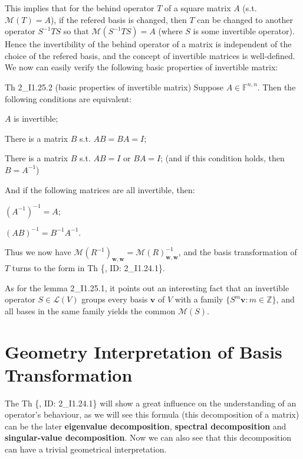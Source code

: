 \documentclass{article}
\begin{document}
This implies that for the behind operator $T$ of a square matrix $A$ (s.t. $\mathcal{M}(T) = A$), if the refered basis is changed, then $T$ can be changed to another operator $S^{-1}TS$ so that $\mathcal{M}(S^{-1}TS) = A$ (where $S$ is some invertible operator). Hence the invertibility of the behind operator of a matrix is independent of the choice of the refered basis, and the concept of invertible matrices is well-defined. We now can easily verify the following basic properties of invertible matrix:

\begin{Th}{Th 2\_I1.25.2 (basic properties of invertible matrix)}
    Suppose $A\in\mathbb{F}^{n,n}$. Then the following conditions are equivalent:
    \begin{compactenum}
        \item $A$ is invertible;        
        \item There is a matrix $B$ s.t. $AB=BA=I$; 
        \item There is a matrix $B$ s.t. $AB=I$ or $BA=I$; (and if this condition holds, then $B = A^{-1}$)
    \end{compactenum}
    And if the following matrices are all invertible, then:
    \begin{compactenum}
        \item $(A^{-1})^{-1} = A$;
        \item $(AB)^{-1} = B^{-1}A^{-1}$.
    \end{compactenum}
\end{Th}

Thus we now have $\mathcal{M}(R^{-1})_{\pmb{w}, \pmb{w}} = \mathcal{M}(R)^{-1}_{\pmb{w}, \pmb{w}}$, and the basis transformation of $T$ turns to the form in Th \{, ID: 2\_I1.24.1\}.

As for the lemma 2\_I1.25.1, it points out an interesting fact that an invertible operator $S\in\mathcal{L}(V)$ groups every basis $\pmb{v}$ of $V$ with a family $\{S^{m}\pmb{v}: m\in\mathbb{Z}\}$, and all bases in the same family yields the common $\mathcal{M}(S)$.

\section{Geometry Interpretation of Basis Transformation}
The Th \{, ID: 2\_I1.24.1\} will show a great influence on the understanding of an operator's behaviour, as we will see this formula (this decomposition of a matrix) can be the later \textbf{eigenvalue decomposition}, \textbf{spectral decomposition} and \textbf{singular-value decomposition}. Now we can also see that this decomposition can have a trivial geometrical interpretation.
\end{document}
